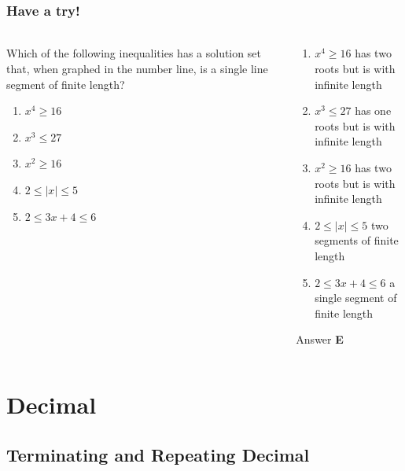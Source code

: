 \documentclass[
	11pt, %
	handout,
]{beamer}
\begin{document}
\begin{frame}
	\frametitle{Have a try!}
	\framesubtitle{}

		\begin{columns}[t] %
		\begin{column}{0.45\textwidth} %
					Which of the following inequalities has a solution set that, when graphed in the
			number line, is a single line segment of finite length?\\
			   \begin{enumerate}[A]
			   \item $x^4 \geq 16$
			   \item $x^3 \leq 27$
			   \item $x^2 \geq 16$
			   \item $2 \leq \mid x \mid \leq 5$
			   \item $2 \leq 3x + 4 \leq 6$
			   \end{enumerate}
		\end{column}
		\begin{column}{0.5\textwidth} %
				\pause
				\begin{enumerate}[A]
			   \item $x^4 \geq 16 $ has two roots but is with infinite length
			   \item $x^3 \leq 27$ has  one roots but is with infinite length
			   \item $x^2 \geq 16$ has  two roots but is with infinite length
			   \item $2 \leq \mid x \mid \leq 5$ two segments of finite length
			   \item $2 \leq 3x + 4 \leq 6$ a single segment of finite length
			   \end{enumerate}
				\bigskip
				Answer \textbf{E}
		\end{column}
	\end{columns}
\end{frame}


\section{Decimal}

\subsection{Terminating and  Repeating Decimal}
\end{document}
